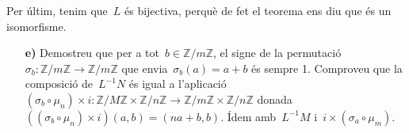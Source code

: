 \documentclass[a4paper]{article}
\newcommand{\ZZ}{\mathbb{Z}}
\begin{document}
Per últim, tenim que~\(L\) és bijectiva, perquè de fet el teorema ens diu que és
un isomorfisme.

\begin{enumerate}
    \item[\textbf{e)}] Demostreu que per a tot~\(b\in\ZZ/m\ZZ\), el signe de la
        permutació~\(\sigma_{b}:\ZZ/m\ZZ\rightarrow\ZZ/m\ZZ\) que
        envia~\(\sigma_{b}(a)=a+b\) és sempre 1.
        Comproveu que la composició de~\(L^{-1}N\) és igual a
        l'aplicació~\((\sigma_{b}\circ\mu_{n})\times
        i:\ZZ/M\ZZ\times\ZZ/n\ZZ\rightarrow\ZZ/m\ZZ\times\ZZ/n\ZZ\)
        donada~\(((\sigma_{b}\circ\mu_{n})\times i)(a,b)=(na+b,b)\).
        Ídem amb~\(L^{-1}M\) i~\(i\times(\sigma_{a}\circ\mu_{m})\).
\end{enumerate}
\end{document}
